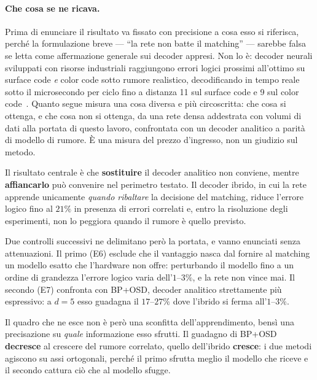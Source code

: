 \begin{onehalfspace}
\paragraph{Che cosa se ne ricava.}
Prima di enunciare il risultato va fissato con precisione a cosa esso si riferisca, perché la formulazione breve --- ``la rete non batte il matching'' --- sarebbe falsa se letta come affermazione generale sui decoder appresi. Non lo è: decoder neurali sviluppati con risorse industriali raggiungono errori logici prossimi all'ottimo su surface code \emph{e} color code sotto rumore realistico, decodificando in tempo reale sotto il microsecondo per ciclo fino a distanza 11 sul surface code e 9 sul color code~\cite{alphaqubit2026}. Quanto segue misura una cosa diversa e più circoscritta: che cosa si ottenga, e che cosa non si ottenga, da una rete densa addestrata con volumi di dati alla portata di questo lavoro, confrontata con un decoder analitico a parità di modello di rumore. È una misura del prezzo d'ingresso, non un giudizio sul metodo.

Il risultato centrale è che \textbf{sostituire} il decoder analitico non conviene, mentre \textbf{affiancarlo} può convenire nel perimetro testato. Il decoder ibrido, in cui la rete apprende unicamente \emph{quando ribaltare} la decisione del matching, riduce l'errore logico fino al $21\%$ in presenza di errori correlati e, entro la risoluzione degli esperimenti, non lo peggiora quando il rumore è quello previsto.

Due controlli successivi ne delimitano però la portata, e vanno enunciati senza attenuazioni. Il primo (E6) esclude che il vantaggio nasca dal fornire al matching un modello esatto che l'hardware non offre: perturbando il modello fino a un ordine di grandezza l'errore logico varia dell'$1$--$3\%$, e la rete non vince mai. Il secondo (E7) confronta con BP+OSD, decoder analitico strettamente più espressivo: a $d=5$ esso guadagna il $17$--$27\%$ dove l'ibrido si ferma all'$1$--$3\%$.

Il quadro che ne esce non è però una sconfitta dell'apprendimento, bensì una precisazione su \emph{quale} informazione esso sfrutti. Il guadagno di BP+OSD \textbf{decresce} al crescere del rumore correlato, quello dell'ibrido \textbf{cresce}: i due metodi agiscono su assi ortogonali, perché il primo sfrutta meglio il modello che riceve e il secondo cattura ciò che al modello sfugge.


\end{onehalfspace}
